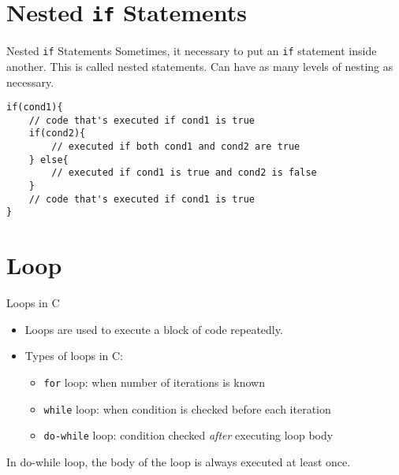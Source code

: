 \documentclass[12pt, aspectratio=169]{beamer}
\begin{document}





    \section{Nested \texttt{if} Statements}

    \begin{frame}[fragile]{Nested \texttt{if} Statements}
        Sometimes, it necessary to put an \texttt{if} statement inside another. This is called nested statements. Can have as many levels of nesting as necessary.

        \begin{verbatim}
if(cond1){
    // code that's executed if cond1 is true
    if(cond2){
        // executed if both cond1 and cond2 are true
    } else{
        // executed if cond1 is true and cond2 is false
    }
    // code that's executed if cond1 is true
}
        \end{verbatim}
    \end{frame}




    \section{Loop}

    \begin{frame}{Loops in C}
        \begin{itemize}
            \item Loops are used to execute a block of code repeatedly.
            \item Types of loops in C:
            \begin{itemize}
                \item \texttt{for} loop: when number of iterations is known
                \item \texttt{while} loop: when condition is checked before each iteration
                \item \texttt{do-while} loop: condition checked \textit{after} executing loop body
            \end{itemize}
        \end{itemize}

        In do-while loop, the body of the loop is always executed at least once.
    \end{frame}
\end{document}
